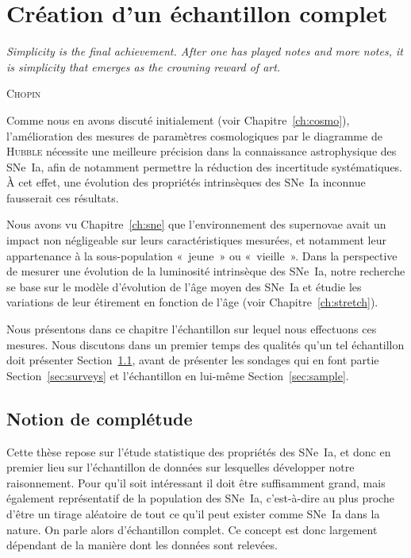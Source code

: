 \documentclass[../main/main.tex]{subfiles}
\begin{document}

\chapter{Cr\'eation d'un \'echantillon complet}\label{ch:sample}

\epigraph{\openquote\textit{Simplicity is the final achievement. After one has
        played notes and more notes, it is simplicity that emerges as the
crowning reward of art.}\closequote}{\textsc{Chopin}}

Comme nous en avons discuté initialement (voir Chapitre~\ref{ch:cosmo}),
l'amélioration des mesures de paramètres cosmologiques par le diagramme de
\textsc{Hubble} nécessite une meilleure précision dans la connaissance
astrophysique des SNe~Ia, afin de notamment permettre la réduction des
incertitude systématiques. À cet effet, une évolution des propriétés
intrinsèques des SNe~Ia inconnue fausserait ces résultats.

Nous avons vu Chapitre~\ref{ch:sne} que l'environnement des supernovae avait un
impact non négligeable sur leurs caractéristiques mesurées, et notamment leur
appartenance à la sous-population «~jeune~» ou «~vieille~». Dans la perspective
de mesurer une évolution de la luminosité intrinsèque des SNe~Ia, notre
recherche se base sur le modèle d'évolution de l'âge moyen des SNe~Ia et étudie
les variations de leur étirement en fonction de l'âge (voir
Chapitre~\ref{ch:stretch}).

Nous présentons dans ce chapitre l'échantillon sur lequel nous effectuons ces
mesures. Nous discutons dans un premier temps des qualités qu'un tel échantillon
doit présenter Section~\ref{sec:compl}, avant de présenter les sondages qui en
font partie Section~\ref{sec:surveys} et l'échantillon en lui-même
Section~\ref{sec:sample}.

\vfill
\minitoc
\vfill
\newpage

\section{Notion de complétude}\label{sec:compl}


Cette thèse repose sur l'étude statistique des propriétés des SNe~Ia, et  donc
en premier lieu sur l'échantillon de données sur lesquelles développer notre
raisonnement. Pour qu'il soit intéressant il doit être suffisamment grand, mais
également représentatif de la population des SNe~Ia, c'est-à-dire au plus proche
d'être un tirage aléatoire de tout ce qu'il peut exister comme SNe~Ia dans la
nature. On parle alors d'échantillon complet. Ce concept est donc largement
dépendant de la manière dont les données sont relevées.
\end{document}
